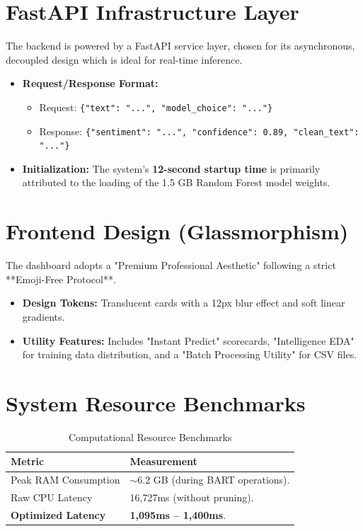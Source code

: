 \documentclass[11pt,oneside]{scrbook}
\begin{document}
\section{FastAPI Infrastructure Layer}
The backend is powered by a FastAPI service layer, chosen for its asynchronous, decoupled design which is ideal for real-time inference.
\begin{itemize}
    \item \textbf{Request/Response Format:}
    \begin{itemize}
        \item Request: \texttt{\{"text": "...", "model\_choice": "..."\}}
        \item Response: \texttt{\{"sentiment": "...", "confidence": 0.89, "clean\_text": "..."\}}
    \end{itemize}
    \item \textbf{Initialization:} The system's \textbf{12-second startup time} is primarily attributed to the loading of the 1.5 GB Random Forest model weights.
\end{itemize}

\section{Frontend Design (Glassmorphism)}
The dashboard adopts a "Premium Professional Aesthetic" following a strict **Emoji-Free Protocol**. 
\begin{itemize}
    \item \textbf{Design Tokens:} Translucent cards with a 12px blur effect and soft linear gradients.
    \item \textbf{Utility Features:} Includes "Instant Predict" scorecards, "Intelligence EDA" for training data distribution, and a "Batch Processing Utility" for CSV files.
\end{itemize}

\section{System Resource Benchmarks}
\begin{table}[h]
\centering
\begin{tabular}{p{5cm}p{8cm}}
\toprule
\textbf{Metric} & \textbf{Measurement} \\
\midrule
Peak RAM Consumption & $\sim$6.2 GB (during BART operations). \\
Raw CPU Latency & 16,727ms (without pruning). \\
\textbf{Optimized Latency} & \textbf{1,095ms -- 1,400ms}. \\
\bottomrule
\end{tabular}
\caption{Computational Resource Benchmarks}
\end{table}
\end{document}
